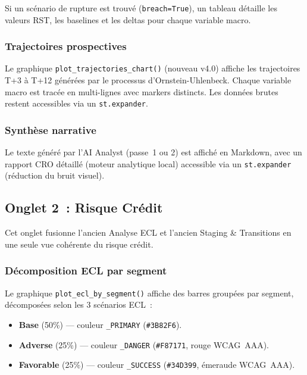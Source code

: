 \documentclass[12pt,a4paper]{article}
\begin{document}
Si un sc\'enario de rupture est trouv\'e (\texttt{breach=True}), un tableau d\'etaille les valeurs RST, les baselines et les deltas pour chaque variable macro.

\subsubsection{Trajectoires prospectives}

Le graphique \texttt{plot\_trajectories\_chart()} (nouveau v4.0) affiche les trajectoires T+3 \`a T+12 g\'en\'er\'ees par le processus d'Ornstein-Uhlenbeck. Chaque variable macro est trac\'ee en multi-lignes avec markers distincts. Les donn\'ees brutes restent accessibles via un \texttt{st.expander}.

\subsubsection{Synth\`ese narrative}

Le texte g\'en\'er\'e par l'AI Analyst (passe~1 ou 2) est affich\'e en Markdown, avec un rapport CRO d\'etaill\'e (moteur analytique local) accessible via un \texttt{st.expander} (r\'eduction du bruit visuel).


\subsection{Onglet 2~: Risque Cr\'edit}
\label{sec:tab2}

Cet onglet fusionne l'ancien \og Analyse ECL \fg{} et l'ancien \og Staging \& Transitions \fg{} en une seule vue coh\'erente du risque cr\'edit.

\subsubsection{D\'ecomposition ECL par segment}

Le graphique \texttt{plot\_ecl\_by\_segment()} affiche des barres group\'ees par segment, d\'ecompos\'ees selon les 3 sc\'enarios ECL~:

\begin{itemize}[leftmargin=2em]
    \item \textbf{Base} (50\%) --- couleur \texttt{\_PRIMARY} (\texttt{\#3B82F6}).
    \item \textbf{Adverse} (25\%) --- couleur \texttt{\_DANGER} (\texttt{\#F87171}, rouge WCAG~AAA).
    \item \textbf{Favorable} (25\%) --- couleur \texttt{\_SUCCESS} (\texttt{\#34D399}, \'emeraude WCAG~AAA).
\end{itemize}
\end{document}
